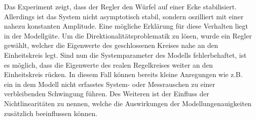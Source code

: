Das Experiment zeigt, dass der Regler den Würfel auf einer Ecke stabilisiert. Allerdings ist das System nicht asymptotisch stabil, sondern oszilliert mit einer nahezu konstanten Amplitude. Eine mögliche Erklärung für diese Verhalten liegt in der Modellgüte. Um die Direktionalitätsproblematik zu lösen, wurde ein Regler gewählt, welcher die Eigenwerte des geschlossenen Kreises nahe an den Einheitskreis legt. Sind nun die Systemparameter des Modells fehlerbehaftet, ist es möglich, dass die Eigenwerte des realen Regelkreises weiter an den Einheitskreis rücken. In diesem Fall können bereits kleine Anregungen wie z.B. ein in dem Modell nicht erfasstes System- oder Messrauschen zu einer verbleibenden Schwingung führen. Des Weiteren ist der Einfluss der Nichtlinearitäten zu nennen, welche die Auswirkungen der Modellungenauigkeiten zusätzlich beeinflussen können. 

